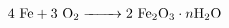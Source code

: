 \documentclass[preview]{standalone}
\begin{document}
\begin{align*}
4 \text{ Fe}  +  3 \text{ O}_2 \xrightarrow{\hphantom{\text{Water}}} 2 \text{ Fe}_2\text{O}_3 \cdot n\text{H}_2\text{O}
\end{align*}
\end{document}
